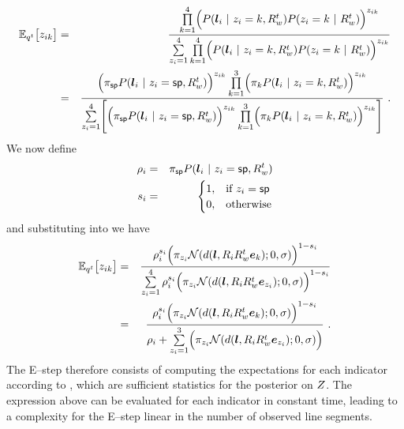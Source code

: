 \begin{eqnarray}
  \Expected_{\PosteriorEst^t}\bigl[ \Indicator_{ik} \bigr] 
  &=&
  \frac{
    \prod_{k=1}^4\limits \Bigl( 
    P(\LineSeg_i ~|~ \Indicator_i=k,\SceneR^t)
    P(\Indicator_i=k ~|~ \SceneR^t)
    \Bigr)^{\Indicator_{ik}}
  }{
    \sum_{\Indicator_i=1}^4\limits
    \prod_{k=1}^4\limits \Bigl( 
    P(\LineSeg_i ~|~ \Indicator_i=k,\SceneR^t)
    P(\Indicator_i=k ~|~ \SceneR^t)
    \Bigr)^{\Indicator_{ik}}
  }\\
  \label{eq:big-expectation}
  &=&
  \frac{
    \Bigl(
    \Mixing_{\Spurious}
    P(\LineSeg_i ~|~ \Indicator_i=\Spurious,\SceneR^t)
    \Bigr)^{\Indicator_{ik}}
    \prod_{k=1}^3\limits \Bigl(
    \Mixing_k
    P(\LineSeg_i ~|~ \Indicator_i=k,\SceneR^t)
    \Bigr)^{\Indicator_{ik}}
  }{
    \sum_{\Indicator_i=1}^4\limits \Biggl[
      \Bigl(
      \Mixing_{\Spurious}
      P(\LineSeg_i ~|~ \Indicator_i=\Spurious,\SceneR^t)
      \Bigr)^{\Indicator_{ik}}
      \prod_{k=1}^3\limits \Bigl( 
      \Mixing_k
      P(\LineSeg_i ~|~ \Indicator_i=k,\SceneR^t)
      \Bigr)^{\Indicator_{ik}}
      \Biggr]
  }~.
\end{eqnarray}
We now define
\begin{eqnarray}
  \SpurJoint_i &=& 
  \Mixing_{\Spurious}
  P(\LineSeg_i ~|~ \Indicator_i=\Spurious,\SceneR^t) \\
  \SpurIndicator_i &=&
  \begin{cases}
    1, & \mbox{if } \Indicator_i = \Spurious \\
    0, & \mbox{otherwise}
  \end{cases}
\end{eqnarray}
and substituting into  we have
\begin{eqnarray}
  \Expected_{\PosteriorEst^t}\bigl[ \Indicator_{ik} \bigr]
  &=&
  \frac{
    \SpurJoint_i^{\SpurIndicator_i}
    \Bigl(
    \Mixing_{\Indicator_i}
    \NormalDistr(\dist(\LineSeg,\CamR_i\SceneR^t\ebasis_k); 0, \sigma)
    \Bigr)^{1-\SpurIndicator_i}
  }{
    \sum_{\Indicator_i=1}^4\limits
    \SpurJoint_i^{\SpurIndicator_i}
    \Bigl(
    \Mixing_{\Indicator_i}
    \NormalDistr(\dist(\LineSeg,\CamR_i\SceneR^t\ebasis_{\Indicator_i}); 0, \sigma)
    \Bigr)^{1-\SpurIndicator_i}
  }\\
  &=&
  \frac{
    \SpurJoint_i^{\SpurIndicator_i}
    \Bigl(
    \Mixing_{\Indicator_i}
    \NormalDistr(\dist(\LineSeg,\CamR_i\SceneR^t\ebasis_k); 0, \sigma)
    \Bigr)^{1-\SpurIndicator_i}
  }{
    \SpurJoint_i +
    \sum_{\Indicator_i=1}^3\limits
    \Bigl(
    \Mixing_{\Indicator_i}
    \NormalDistr(\dist(\LineSeg,\CamR_i\SceneR^t\ebasis_{\Indicator_i}); 0, \sigma)
    \Bigr)
  }~.
  \label{eq:final-estep}
\end{eqnarray}
The E--step therefore consists of computing the expectations for
each indicator according to , which are sufficient
statistics for the posterior on $\Indicators$. The expression
above can be evaluated for each indicator in constant time, leading to
a complexity for the E--step linear in the number of observed line
segments.

